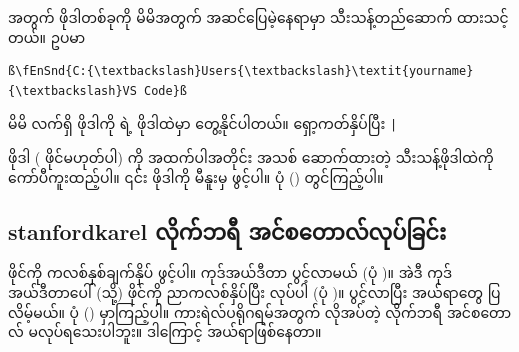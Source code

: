 အတွက် ဖိုဒါတစ်ခုကို မိမိအတွက် အဆင်ပြေမဲ့နေရာမှာ သီးသန့်တည်ဆောက် ထားသင့်တယ်။ ဥပမာ 
%
\begin{verbatim}
ß\fEnSnd{C:{\textbackslash}Users{\textbackslash}\textit{yourname}{\textbackslash}VS Code}ß
\end{verbatim}
%
\begin{mytcbox}
\noindent \qquad မိမိ လက်ရှိ  ဖိုဒါကို    ရဲ့   ဖိုဒါထဲမှာ တွေ့နိုင်ပါတယ်။  ရှော့ကတ်နှိပ်ပြီး \texttt|%
\end{mytcbox}

 ဖိုဒါ ( ဖိုင်မဟုတ်ပါ) ကို အထက်ပါအတိုင်း အသစ် ဆောက်ထားတဲ့  သီးသန့်ဖိုဒါထဲကို ကော်ပီကူးထည့်ပါ။ ၎င်း  ဖိုဒါကို   မီနူးမှ ဖွင့်ပါ။ ပုံ (\fRefNo{\ref{fig:opnmtkrl}}) တွင်ကြည့်ပါ။



\clearpage
\subsection*{stanfordkarel လိုက်ဘရီ အင်စတောလ်လုပ်ခြင်း}
 ဖိုင်ကို ကလစ်နှစ်ချက်နှိပ် ဖွင့်ပါ။ ကုဒ်အယ်ဒီတာ ပွင့်လာမယ် (ပုံ \fRefNo{\ref{fig:edtmtkrl}})။ အဲဒီ ကုဒ်အယ်ဒီတာပေါ် (သို့)  ဖိုင်ကို ညာကလစ်နှိပ်ပြီး  လုပ်ပါ (ပုံ \fRefNo{\ref{fig:runmtkrl2}})။  ပွင့်လာပြီး အယ်ရာတွေ ပြလိမ့်မယ်။ ပုံ (\fRefNo{\ref{fig:mtkrlfstrun}}) မှာကြည့်ပါ။ ကားရဲလ်ပရိုဂရမ်အတွက် လိုအပ်တဲ့  လိုက်ဘရီ အင်စတောလ် မလုပ်ရသေးပါဘူး။ ဒါကြောင့် အယ်ရာဖြစ်နေတာ။

\begin{figure}[tbh!]
\caption{} 
\label{fig:edtmtkrl}
\end{figure}

